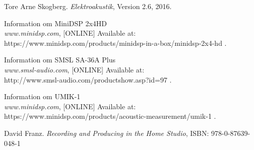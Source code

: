 \begin{thebibliography}{9}


	Tore Arne Skogberg.
	\textit{Elektroakustik},
	Version 2.6,
	2016.
		
	Information om MiniDSP 2x4HD\\
	\textit{www.minidsp.com},
	[ONLINE] Available at:\\ https://www.minidsp.com/products/minidsp-in-a-box/minidsp-2x4-hd
	.
	
	Information om SMSL SA-36A Plus\\
	\textit{www.smsl-audio.com},
	[ONLINE] Available at:\\ http://www.smsl-audio.com/productshow.asp?id=97
	.	
	
	
	Information om UMIK-1\\
	\textit{www.minidsp.com},
	[ONLINE] Available at:\\ https://www.minidsp.com/products/acoustic-measurement/umik-1
	.
	
	David Franz.
	\textit{Recording and Producing in the Home Studio},
	ISBN: 978-0-87639-048-1


\end{thebibliography}